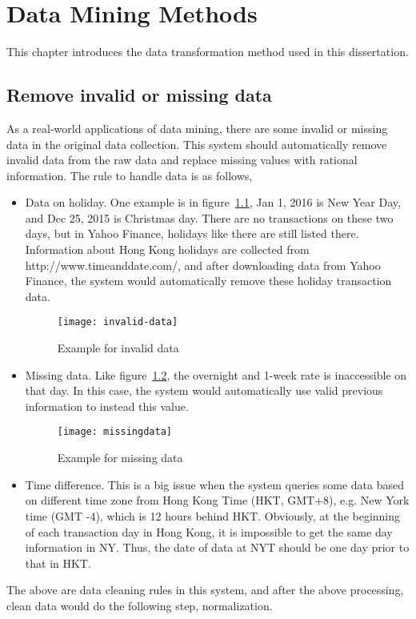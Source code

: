 \chapter{Data Mining Methods}
\label{ch:mining}

This chapter introduces the data transformation method used in this dissertation.
\section{Remove invalid or missing data}
As a real-world applications of data mining, there are some invalid or missing data in the original data collection. This system should automatically remove invalid data from the raw data and replace missing values with rational information. The rule to handle data is as follows,

\clearpage
\begin{itemize}
	\item Data on holiday. One example is in figure~\ref{fg:invalid_data}, Jan 1, 2016 is New Year Day, and Dec 25, 2015 is Christmas day. There are no transactions on these two days, but in Yahoo Finance, holidays like there are still listed there. Information about Hong Kong holidays are collected from http://www.timeanddate.com/, and after downloading data from Yahoo Finance, the system would automatically remove these holiday transaction data.
	\begin{figure}[h]
		\centering
		\texttt{[image: invalid-data]}
		\caption{Example for invalid data}
		\label{fg:invalid_data}
	\end{figure}
	\item Missing data. Like figure~\ref{fg:missing_data}, the overnight and 1-week rate is inaccessible on that day. In this case, the system would automatically use valid previous information to instead this value.
	\begin{figure}[h]
		\centering
		\texttt{[image: missingdata]}
		\caption{Example for missing data}
		\label{fg:missing_data}
	\end{figure}
	\clearpage
	\item Time difference. This is a big issue when the system queries some data based on different time zone from Hong Kong Time (HKT, GMT+8), e.g. New York time (GMT -4), which is 12 hours behind HKT. Obviously, at the beginning of each transaction day in Hong Kong, it is impossible to get the same day information in NY. Thus, the date of data at NYT should be one day prior to that in HKT.
\end{itemize}


The above are data cleaning rules in this system, and after the above processing, clean data would do the following step, normalization.